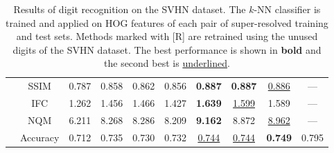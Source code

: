 \begin{table} [tb]
{\begin{tabular}{|l|c|ccccccc|c|}
  & SSIM & 0.787 & 0.858 & 0.862 & 0.856 & \textbf{0.887} & \textbf{0.887} & \underline{0.886} & --- \\
  & IFC & 1.262 & 1.456 & 1.466 & 1.427 & \textbf{1.639} & \underline{1.599} & 1.589 & --- \\
  & NQM & 6.211 & 8.268 & 8.286 & 8.209 & \textbf{9.162} & 8.872 & \underline{8.962} & --- \\   \hline
  & Accuracy & 0.712 & 0.735 & 0.730 & 0.732 & \underline{0.744} & \underline{0.744} & \textbf{0.749} & 0.795 \\
  \hline
\end{tabular}
}
\caption{Results of digit recognition on the SVHN dataset. 
The $k$-NN classifier is trained and applied on HOG features of each pair of super-resolved 
training and test sets. Methods marked with [R] are retrained using the unused digits of 
the SVHN dataset. The best performance is shown in \textbf{bold} and the second best is \underline{underlined}.}
\label{sr:tab:dr}
\end{table}

